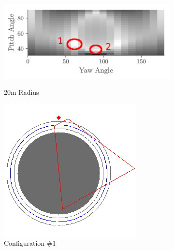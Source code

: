 \documentclass[a4paper,12pt,twoside,openright]{report}
\begin{document}
\begin{figure}[h!]
\begin{subfigure}[b]{0.42\textwidth}
    \centering
    \includegraphics[width=\textwidth]{figures/simple_objective/pitch_yaw_at_radius_20_annotated.png}
    \label{fig:simpleobjective:0curvature}
    \caption{20m Radius}
\end{subfigure}
\begin{subfigure}[b]{0.28\textwidth}
    \centering
    \includegraphics[width=\textwidth]{figures/simple_objective/radius_20m_pos1_small.png}
    \caption{Configuration \#1}
\end{subfigure}
\begin{subfigure}[b]{0.28\textwidth}
    \centering

\end{subfigure}
\end{figure}
\end{document}
